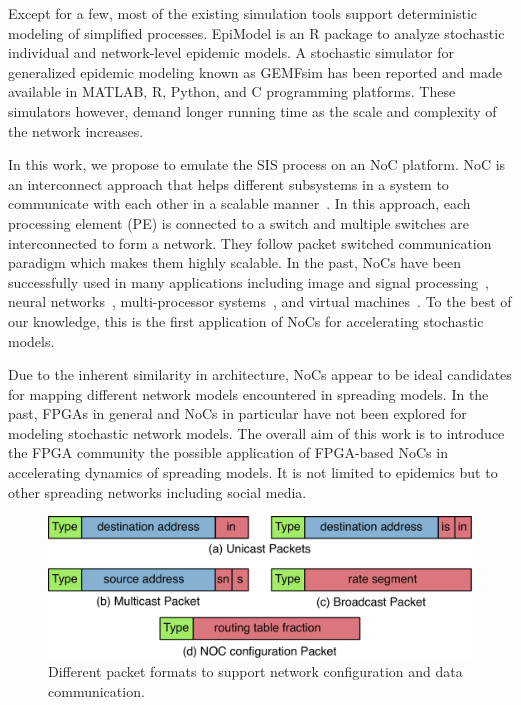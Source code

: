 Except for a few, most of the existing simulation tools support deterministic modeling of simplified processes. EpiModel \cite{Jenness2018} is an R package to analyze stochastic individual and network-level epidemic models. A stochastic simulator for generalized epidemic modeling known as GEMFsim \cite{SAHNEH201736} has been reported and made available in MATLAB, R, Python, and C programming platforms. These simulators however, demand longer running time as the scale and complexity of the network increases.

In this work, we propose to emulate the SIS process on an NoC platform.
NoC is an interconnect approach that helps different subsystems in a system to communicate with each other in a scalable manner~\cite{Dally2003}.
In this approach, each processing element (PE) is connected to a switch and multiple switches are interconnected to form a network.
They follow packet switched communication paradigm which makes them highly scalable.  
In the past, NoCs have been successfully used in many applications including image and signal processing~\cite{Joshi2007}, neural networks~\cite{Furber2013}, multi-processor systems~\cite{Bertozzi2005}, and virtual machines~\cite{Mathias2006}.
To the best of our knowledge, this is the first application of NoCs for accelerating stochastic models.

Due to the inherent similarity in architecture, NoCs appear to be ideal candidates for mapping different network models encountered in spreading models.
In the past, FPGAs in general and NoCs in particular have not been explored for modeling stochastic network models.
The overall aim of this work is to introduce the FPGA community the possible application of FPGA-based NoCs in accelerating dynamics of spreading models. It is not limited to epidemics but to other spreading networks including social media. 

\begin{figure}[t!]
    \begin{center}
    \includegraphics[width=0.75\columnwidth]{Figures/packet_format.pdf}
    \caption{Different packet formats to support network configuration and data communication.} 
    \label{figure:pktformat}
    \end{center}
    \vspace{-8mm}
\end{figure}